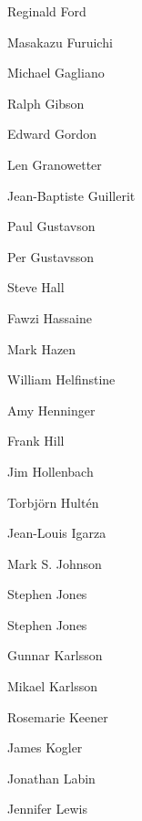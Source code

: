 \thispagestyle{hlafrontroman}
\begingroup
\setlength{\parindent}{0pt}
\setlength{\parskip}{0pt}
\frontBody
\vspace*{-11.5pt}

\noindent\hspace*{29.2pt}%
\begin{minipage}[t]{110pt}
    \frontNamesContinuation
    Reginald Ford\par
    Masakazu Furuichi\par
    Michael Gagliano\par
    Ralph Gibson\par
    Edward Gordon\par
    Len Granowetter\par
    Jean-Baptiste Guillerit\par
    Paul Gustavson\par
    Per Gustavsson\par
    Steve Hall\par
    Fawzi Hassaine\par
    Mark Hazen\par
    William Helfinstine\par
    Amy Henninger\par
    Frank Hill\par
    Jim Hollenbach\par
    Torbjörn Hultén\par
    Jean-Louis Igarza\par
    Mark S. Johnson\par
    Stephen Jones\par
    Stephen Jones\par
    Gunnar Karlsson\par
    Mikael Karlsson\par
    Rosemarie Keener\par
    James Kogler\par
    Jonathan Labin\par
    Jennifer Lewis
\end{minipage}%
\hspace*{45.5pt}%

